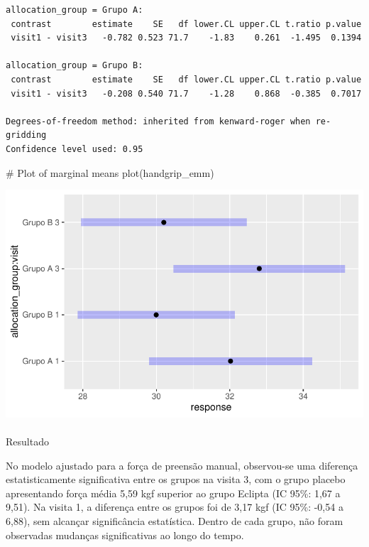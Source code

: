 \documentclass[
  12pt,
]{article}
\makeatletter
\let\oldparagraph\paragraph
\renewcommand{\paragraph}{
    \@ifstar
      \xxxParagraphStar
      \xxxParagraphNoStar
  }
\newcommand{\xxxParagraphStar}[1]{\oldparagraph*{#1}\mbox{}}
\newcommand{\xxxParagraphNoStar}[1]{\oldparagraph{#1}\mbox{}}
\newenvironment{Shaded}{\begin{snugshade}}{\end{snugshade}}
\newcommand{\CommentTok}[1]{\textcolor[rgb]{0.37,0.37,0.37}{#1}}
\newcommand{\FunctionTok}[1]{\textcolor[rgb]{0.28,0.35,0.67}{#1}}
\newcommand{\NormalTok}[1]{\textcolor[rgb]{0.00,0.23,0.31}{#1}}
\makeatother
\begin{document}
\begin{verbatim}
allocation_group = Grupo A:
 contrast        estimate    SE   df lower.CL upper.CL t.ratio p.value
 visit1 - visit3   -0.782 0.523 71.7    -1.83    0.261  -1.495  0.1394

allocation_group = Grupo B:
 contrast        estimate    SE   df lower.CL upper.CL t.ratio p.value
 visit1 - visit3   -0.208 0.540 71.7    -1.28    0.868  -0.385  0.7017

Degrees-of-freedom method: inherited from kenward-roger when re-gridding 
Confidence level used: 0.95 
\end{verbatim}

\begin{Shaded}
\begin{Highlighting}[]
\CommentTok{\# Plot of marginal means}
\FunctionTok{plot}\NormalTok{(handgrip\_emm)}
\end{Highlighting}
\end{Shaded}

\includegraphics{Outcomes_files/figure-pdf/handgrip_sens_emm-1.pdf}

\paragraph{Resultado}\label{resultado-20}

No modelo ajustado para a força de preensão manual, observou-se uma
diferença estatisticamente significativa entre os grupos na visita 3,
com o grupo placebo apresentando força média 5,59 kgf superior ao grupo
Eclipta (IC 95\%: 1,67 a 9,51). Na visita 1, a diferença entre os grupos
foi de 3,17 kgf (IC 95\%: -0,54 a 6,88), sem alcançar significância
estatística. Dentro de cada grupo, não foram observadas mudanças
significativas ao longo do tempo.
\end{document}
